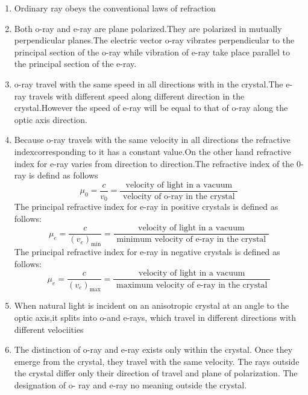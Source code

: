   \begin{enumerate}
  	\item Ordinary ray obeys the conventional laws of refraction
  	\item Both o-ray and e-ray are plane polarized.They are polarized in mutually perpendicular planes.The electric vector o-ray vibrates perpendicular to the principal section of the o-ray while vibration of e-ray take place parallel to the principal section of the e-ray.
  	\item o-ray travel with the same speed in all directions with in the crystal.The e-ray travels with different speed along different direction in the crystal.However the speed of e-ray will be equal to that of o-ray along the optic axis direction.
  	\item Because o-ray travels with the same velocity in all directions the refractive indexcorresponding to it has a constant value.On the other hand refractive index for e-ray varies from direction to direction.The refractive index of the 0-ray is defind as follows\\
  	$$\mu_{0}=\frac{c}{v_{0}}=\frac{\text { velocity of light in a vacuum }}{\text { velocity of o-ray in the crystal }}$$
  	The principal refractive index for e-ray in positive crystals is defined as follows:
  	$$
  	\mu_{e}=\frac{c}{\left(v_{e}\right)_{\min }}=\frac{\text { velocity of light in a vacuum }}{\text { minimum velocity of e-ray in the crystal }}
  	$$
  	The principal refractive index for e-ray in negative crystals is defined as follows:
  	$$
  	\mu_{e}=\frac{c}{\left(v_{e}\right)_{\max }}=\frac{\text { velocity of light in a vacuum }}{\text { maximum velocity of e-ray in the crystal }}
  	$$
  	\item When natural light is incident on an anisotropic crystal at an angle to the optic axis,it splits into o-and e-rays, which travel in different directions with different velociities
  	\item The distinction of o-ray and e-ray exists only within the crystal. Once they emerge from the crystal, they travel with the same velocity. The rays outside the crystal differ only their direction of travel and plane of polarization. The designation of o- ray and e-ray no meaning outside the crystal.
  \end{enumerate}
